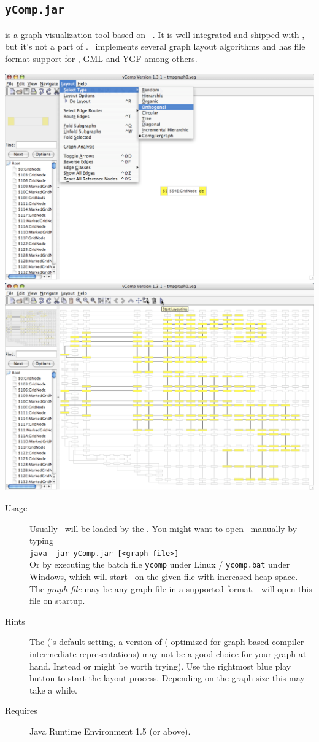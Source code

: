 \subsection{\texttt{yComp.jar}}
\label{tools:ycomp}
\yComp{} \cite{ycomp} is a graph visualization tool based on \yFiles\ \cite{yfiles}.
It is well integrated and shipped with \GrG, but it's not a part of \GrG.
\yComp\ implements several graph layout algorithms and has file format support for , GML and YGF among others.
\begin{center}
\includegraphics[width=0.45\linewidth]{fig/ycomp1.pdf} \includegraphics[width=0.45\linewidth]{fig/ycomp2.pdf}
\end{center}
\begin{description}
  \item[Usage] Usually \yComp\ will be loaded by the \GrShell. You might want to open \yComp\ manually by typing\\
   \texttt{java -jar yComp.jar [<graph-file>]}\\
  Or by executing the batch file \texttt{ycomp} under Linux / \texttt{ycomp.bat} under Windows,
  which will start \yComp\ on the given file with increased heap space.
  The \emph{graph-file} may be any graph file in a supported format. \yComp\ will open this file on startup.
  \item[Hints] The   (\yComp's default setting, a version of (\texttt{} optimized for graph based compiler intermediate representations) may not be a good choice for your graph at hand.
  Instead \texttt{} or \texttt{} might be worth trying).
  Use the rightmost blue play button to start the layout process. Depending on the graph size this may take a while.
  \item[Requires] Java Runtime Environment 1.5 (or above).
\end{description}


